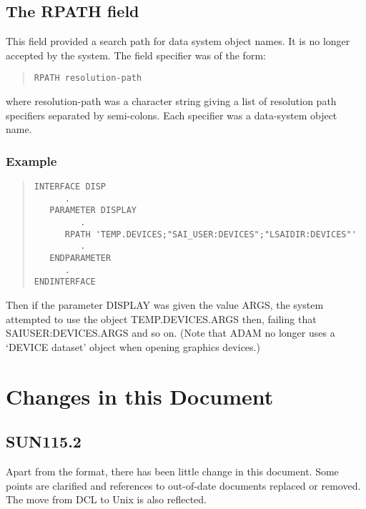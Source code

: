 \documentclass[twoside,11pt]{article}
\newcommand{\xlabel}[1]{}
\renewcommand{\_}{\texttt{\symbol{95}}}
\begin{document}
\subsection{The RPATH field\xlabel{the_rpath_field}}

This field provided a search path for data system object names.
It is no longer accepted by the system.
The field specifier was of the form:
\begin{quote} \begin{verbatim}
RPATH resolution-path
\end{verbatim} \end{quote}
where resolution-path was a character string giving a list of resolution path
specifiers separated by semi-colons.
Each specifier was a data-system object name.

\subsubsection*{Example}
\begin{quote} \begin{verbatim}
INTERFACE DISP
      .
   PARAMETER DISPLAY
         .
      RPATH 'TEMP.DEVICES;"SAI_USER:DEVICES";"LSAIDIR:DEVICES"'
         .
   ENDPARAMETER
      .
ENDINTERFACE
\end{verbatim} \end{quote}
Then if the parameter DISPLAY was given the value ARGS, the system
attempted to use the object TEMP.DEVICES.ARGS then, failing that
SAI\_USER:DEVICES.ARGS and so on.
(Note that ADAM no longer uses a `DEVICE dataset' object when opening graphics
devices.)

\newpage
\section{Changes in this Document\xlabel{changes_in_this_document}}
\subsection{SUN115.2}
Apart from the format, there has been little change in this document.
Some points are clarified and references to out-of-date documents replaced or
removed. The move from DCL to Unix is also reflected.
\end{document}

